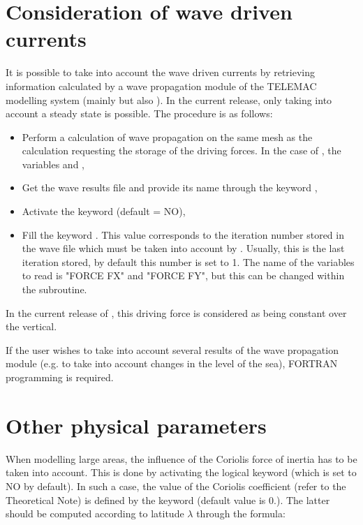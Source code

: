 \section{Consideration of wave driven currents}

It is possible to take into account the wave driven currents by retrieving
information calculated by a wave propagation module of the TELEMAC modelling
system (mainly \tomawac but also \artemis). In the current release,
only taking into account a steady state is possible. The procedure is as
follows:

\begin{itemize}
\item  Perform a calculation of wave propagation on the same mesh as the
 calculation requesting the storage of the driving forces. In the
case of \tomawac, the variables  and ,

\item  Get the wave results file and provide its name through the keyword
,

\item  Activate the keyword  (default = NO),

\item  Fill the keyword . This value
corresponds to the iteration number stored in the wave file which must be taken
into account by . Usually, this is the last iteration stored, by
default this number is set to 1. The name of the variables to read is "FORCE
FX" and "FORCE FY", but this can be changed within the  subroutine.
\end{itemize}

In the current release of , this driving force is considered as being
constant over the vertical.

If the user wishes to take into account several results of the wave propagation
module (e.g. to take into account changes in the level of the sea), FORTRAN
programming is required.

\section{Other physical parameters}

When modelling large areas, the influence of the Coriolis force of inertia
has to be taken into account. This is done by activating the logical keyword
 (which is set to NO by default). In such a case, the value of
the Coriolis coefficient (refer to the Theoretical Note) is defined by the
keyword  (default value is 0.). The latter should
be computed according to latitude $\lambda$ through the formula:

